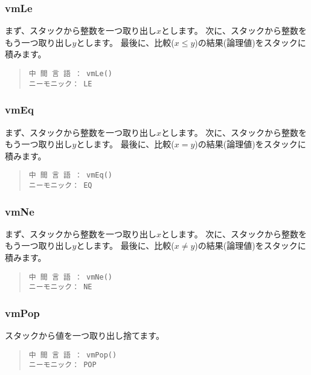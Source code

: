 \subsubsection{vmLe}

まず、スタックから整数を一つ取り出し$x$とします。
次に、スタックから整数をもう一つ取り出し$y$とします。
最後に、比較($x \le y$)の結果(論理値)をスタックに積みます。

\begin{quote}
\begin{verbatim}
中 間 言 語 ： vmLe()
ニーモニック： LE
\end{verbatim}
\end{quote}

\subsubsection{vmEq}

まず、スタックから整数を一つ取り出し$x$とします。
次に、スタックから整数をもう一つ取り出し$y$とします。
最後に、比較($x = y$)の結果(論理値)をスタックに積みます。

\begin{quote}
\begin{verbatim}
中 間 言 語 ： vmEq()
ニーモニック： EQ
\end{verbatim}
\end{quote}

\subsubsection{vmNe}

まず、スタックから整数を一つ取り出し$x$とします。
次に、スタックから整数をもう一つ取り出し$y$とします。
最後に、比較($x \neq y$)の結果(論理値)をスタックに積みます。

\begin{quote}
\begin{verbatim}
中 間 言 語 ： vmNe()
ニーモニック： NE
\end{verbatim}
\end{quote}

\subsubsection{vmPop}

スタックから値を一つ取り出し捨てます。

\begin{quote}
\begin{verbatim}
中 間 言 語 ： vmPop()
ニーモニック： POP
\end{verbatim}
\end{quote}

